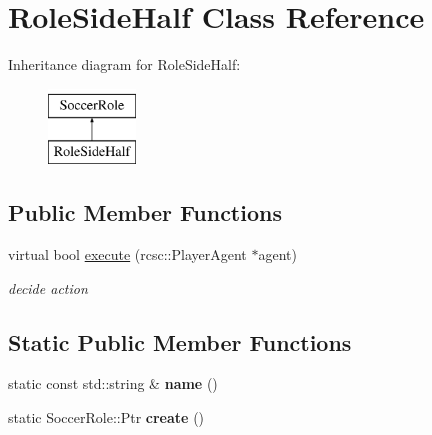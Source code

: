 \hypertarget{classRoleSideHalf}{
\section{RoleSideHalf Class Reference}
\label{classRoleSideHalf}
}
Inheritance diagram for RoleSideHalf:\begin{figure}[H]
\begin{center}
\leavevmode
\includegraphics[height=2.000000cm]{classRoleSideHalf}
\end{center}
\end{figure}
\subsection*{Public Member Functions}
\begin{DoxyCompactItemize}
\item 
\hypertarget{classRoleSideHalf_a4981a3f67608d58302d716f89614902d}{
virtual bool \hyperlink{classRoleSideHalf_a4981a3f67608d58302d716f89614902d}{execute} (rcsc::PlayerAgent $\ast$agent)}
\label{classRoleSideHalf_a4981a3f67608d58302d716f89614902d}

\begin{DoxyCompactList}\small\item\em decide action \item\end{DoxyCompactList}\end{DoxyCompactItemize}
\subsection*{Static Public Member Functions}
\begin{DoxyCompactItemize}
\item 
\hypertarget{classRoleSideHalf_ac9097669a3615116072ee16744a57b19}{
static const std::string \& {\bfseries name} ()}
\label{classRoleSideHalf_ac9097669a3615116072ee16744a57b19}

\item 
\hypertarget{classRoleSideHalf_a0ad81f04e5a9f23eee2ef5450e0647e1}{
static SoccerRole::Ptr {\bfseries create} ()}
\label{classRoleSideHalf_a0ad81f04e5a9f23eee2ef5450e0647e1}

\end{DoxyCompactItemize}
